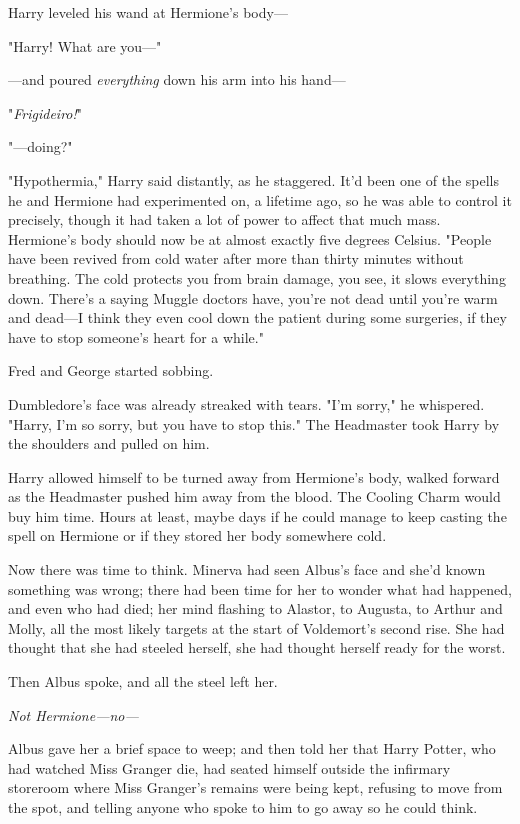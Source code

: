 Harry leveled his wand at Hermione's body---

"Harry! What are you---"

---and poured \emph{everything} down his arm into his hand---

"\emph{Frigideiro!}"

"---doing?"

"Hypothermia," Harry said distantly, as he staggered. It'd been one of the 
spells he and Hermione had experimented on, a lifetime ago, so he was able to 
control it precisely, though it had taken a lot of power to affect that much 
mass. Hermione's body should now be at almost exactly five degrees Celsius. 
"People have been revived from cold water after more than thirty minutes 
without breathing. The cold protects you from brain damage, you see, it slows 
everything down. There's a saying Muggle doctors have, you're not dead until 
you're warm and dead---I think they even cool down the patient during some 
surgeries, if they have to stop someone's heart for a while."

Fred and George started sobbing.

Dumbledore's face was already streaked with tears. "I'm sorry," he whispered. 
"Harry, I'm so sorry, but you have to stop this." The Headmaster took Harry by 
the shoulders and pulled on him.

Harry allowed himself to be turned away from Hermione's body, walked forward as 
the Headmaster pushed him away from the blood. The Cooling Charm would buy him 
time. Hours at least, maybe days if he could manage to keep casting the spell 
on Hermione or if they stored her body somewhere cold.

Now there was time to think.
\sbreak
Minerva had seen Albus's face and she'd known something was wrong; there had 
been time for her to wonder what had happened, and even who had died; her mind 
flashing to Alastor, to Augusta, to Arthur and Molly, all the most likely 
targets at the start of Voldemort's second rise. She had thought that she had 
steeled herself, she had thought herself ready for the worst.

Then Albus spoke, and all the steel left her.

\emph{Not Hermione---no---}

Albus gave her a brief space to weep; and then told her that Harry Potter, who 
had watched Miss Granger die, had seated himself outside the infirmary 
storeroom where Miss Granger's remains were being kept, refusing to move from 
the spot, and telling anyone who spoke to him to go away so he could think.


